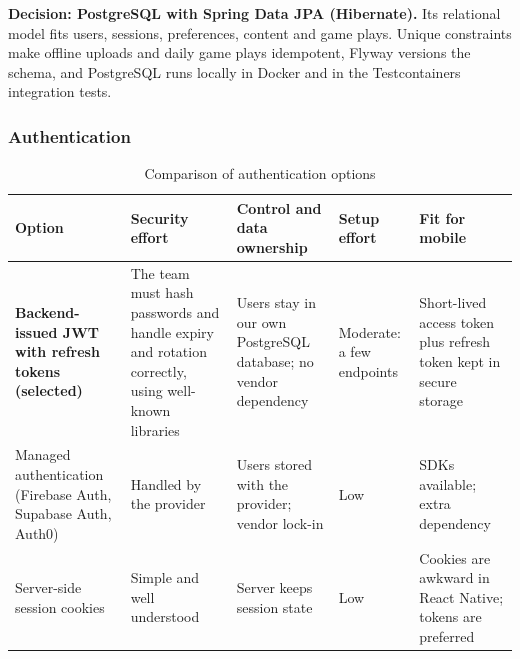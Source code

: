 \endgroup

\noindent\textbf{Decision: PostgreSQL with Spring Data JPA (Hibernate).} Its relational model fits users, sessions, preferences, content and game plays. Unique constraints make offline uploads and daily game plays idempotent, Flyway versions the schema, and PostgreSQL runs locally in Docker and in the Testcontainers integration tests.


\subsubsection{Authentication}

\begingroup

\footnotesize

\begin{longtable}{|>{\raggedright\arraybackslash}p{2.6cm}|>{\raggedright\arraybackslash}p{2.95cm}|>{\raggedright\arraybackslash}p{2.95cm}|>{\raggedright\arraybackslash}p{2.95cm}|>{\raggedright\arraybackslash}p{2.95cm}|}

\caption{Comparison of authentication options}\label{tab:tech-auth}\\

\hline

\textbf{Option} & \textbf{Security effort} & \textbf{Control and data ownership} & \textbf{Setup effort} & \textbf{Fit for mobile} \\ \hline

\textbf{Backend-issued JWT with refresh tokens (selected)} & The team must hash passwords and handle expiry and rotation correctly, using well-known libraries &

Users stay in our own PostgreSQL database; no vendor dependency &

Moderate: a few endpoints &

Short-lived access token plus refresh token kept in secure storage \\ \hline

Managed authentication (Firebase Auth, Supabase Auth, Auth0) & Handled by the provider &

Users stored with the provider; vendor lock-in &

Low &

SDKs available; extra dependency \\ \hline

Server-side session cookies & Simple and well understood &

Server keeps session state &

Low &

Cookies are awkward in React Native; tokens are preferred \\ \hline

\end{longtable}

